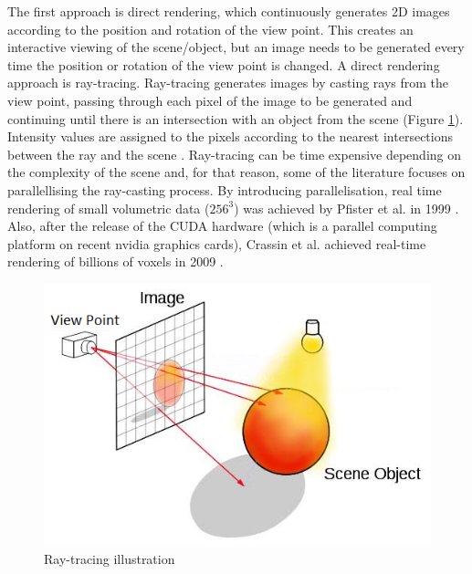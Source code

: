 \documentclass{subfiles}
\begin{document}
\par{ \color{blue} The first approach is direct rendering, which continuously generates 2D images according to the position and rotation of the view point. This creates an interactive viewing of the scene/object, but an image needs to be generated every time the position or rotation of the view point is changed. A direct rendering approach is ray-tracing. Ray-tracing generates images by casting rays from the view point, passing through each pixel of the image to be generated and continuing until there is an intersection with an object from the scene (Figure \ref{fig:Raytracing}). Intensity values are assigned to the pixels according to the nearest intersections between the ray and the scene \cite{Hanrahan1983}.} Ray-tracing can be time expensive depending on the complexity of the scene and, for that reason, some of the literature focuses on parallellising the ray-casting process. By introducing parallelisation, real time rendering of small volumetric data ($256^3$) was achieved by Pfister et al. in 1999 \cite{Pfister1999}. Also, after the release of the CUDA hardware \cite{Nickolls2008} (which is a parallel computing platform on recent nvidia graphics cards), Crassin et al. achieved real-time rendering of billions of voxels in 2009 \cite{Crassin2009}. 
	
	 \begin{figure} [h!]
	 	\centering
	 	\includegraphics[width=.8\textwidth]{img/RayTracing}
	 	\caption{Ray-tracing illustration}
	 	\label{fig:Raytracing}
	 \end{figure}
	 
\end{document}
